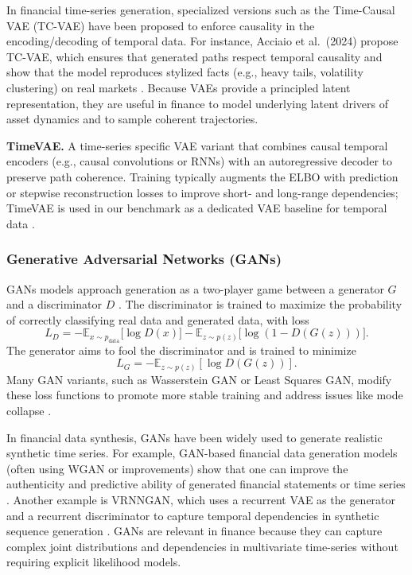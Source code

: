 \documentclass[sigconf]{acmart}
\begin{document}
    In financial time-series generation, specialized versions such 
    as the Time-Causal VAE (TC-VAE) have been proposed to enforce 
    causality in the encoding/decoding of temporal data. For 
    instance, Acciaio et al.\ (2024) propose TC-VAE, which 
    ensures that generated paths respect temporal causality and 
    show that the model reproduces stylized facts (e.g., heavy 
    tails, volatility clustering) on real markets 
    \cite{acciaio2024vae}. Because VAEs provide a principled 
    latent representation, they are useful in finance to model 
    underlying latent drivers of asset dynamics and to sample 
    coherent trajectories.
    \begin{enumerate}[label=\textbf{[A\arabic*]},resume]
      \item \label{alg:timevae} \textbf{TimeVAE.}
      A time-series specific VAE variant that combines causal
      temporal encoders (e.g., causal convolutions or RNNs) with an
      autoregressive decoder to preserve path coherence. Training
      typically augments the ELBO with prediction or stepwise
      reconstruction losses to improve short- and long-range
      dependencies; TimeVAE is used in our benchmark as a
      dedicated VAE baseline for temporal data \cite{Desai21}.
    \end{enumerate}
    
    \subsubsection{Generative Adversarial Networks (GANs)}
    GANs models approach 
    generation as a two-player game between a generator \(G\) and 
    a discriminator \(D\) \cite{Goodfellow14}. The discriminator 
    is trained to 
    maximize the probability of correctly classifying real data 
    and generated data, with loss
    \[
    L_D = -\mathbb{E}_{x \sim p_{\text{data}}}\bigl[\log D(x)
    \bigr] - \mathbb{E}_{z \sim p(z)}\bigl[\log (1 - D(G(z)))
    \bigr].
    \]
    The generator aims to fool the discriminator and is trained to 
    minimize
    \[
    L_G = -\mathbb{E}_{z \sim p(z)}[\log D(G(z))].
    \]
    Many GAN variants, such as Wasserstein GAN or Least Squares 
    GAN, modify these loss functions to promote more stable 
    training and address issues like mode collapse \cite{Goodfellow14} .
    
    In financial data synthesis, GANs have been widely used to 
    generate realistic synthetic time series. For example, 
    GAN-based financial data generation models (often using WGAN 
    or improvements) show that one can improve the authenticity 
    and predictive ability of generated financial statements or 
    time series \cite{Qi25}. Another example is 
    VRNNGAN, which uses a recurrent VAE as the generator and a 
    recurrent discriminator to capture temporal dependencies in 
    synthetic sequence generation \cite{Lee22}. GANs are 
    relevant in finance because they can capture complex joint 
    distributions and dependencies in multivariate time-series 
    without requiring explicit likelihood models.
    
\end{document}
